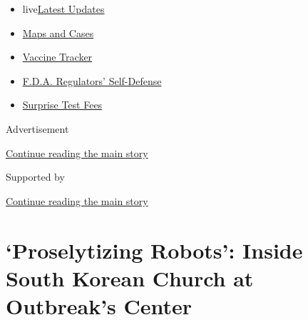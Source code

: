 \begin{itemize}
\tightlist
\item
  live\href{https://www.nytimes3xbfgragh.onion/2020/09/12/world/covid-19-coronavirus.html?name=styln-coronavirus-national\&region=TOP_BANNER\&block=storyline_menu_recirc\&action=click\&pgtype=Article\&impression_id=214bd4e1-f52e-11ea-aca2-5fcae7f3caf4\&variant=undefined}{Latest
  Updates}
\item
  \href{https://www.nytimes3xbfgragh.onion/interactive/2020/us/coronavirus-us-cases.html?name=styln-coronavirus-national\&region=TOP_BANNER\&block=storyline_menu_recirc\&action=click\&pgtype=Article\&impression_id=214bd4e2-f52e-11ea-aca2-5fcae7f3caf4\&variant=undefined}{Maps
  and Cases}
\item
  \href{https://www.nytimes3xbfgragh.onion/interactive/2020/science/coronavirus-vaccine-tracker.html?name=styln-coronavirus-national\&region=TOP_BANNER\&block=storyline_menu_recirc\&action=click\&pgtype=Article\&impression_id=214bd4e3-f52e-11ea-aca2-5fcae7f3caf4\&variant=undefined}{Vaccine
  Tracker}
\item
  \href{https://www.nytimes3xbfgragh.onion/2020/09/10/us/politics/fda-coronavirus-vaccine.html?name=styln-coronavirus-national\&region=TOP_BANNER\&block=storyline_menu_recirc\&action=click\&pgtype=Article\&impression_id=214bd4e4-f52e-11ea-aca2-5fcae7f3caf4\&variant=undefined}{F.D.A.
  Regulators' Self-Defense}
\item
  \href{https://www.nytimes3xbfgragh.onion/2020/09/09/upshot/coronavirus-surprise-test-fees.html?name=styln-coronavirus-national\&region=TOP_BANNER\&block=storyline_menu_recirc\&action=click\&pgtype=Article\&impression_id=214bfbf0-f52e-11ea-aca2-5fcae7f3caf4\&variant=undefined}{Surprise
  Test Fees}
\end{itemize}

Advertisement

\protect\hyperlink{after-top}{Continue reading the main story}

Supported by

\protect\hyperlink{after-sponsor}{Continue reading the main story}

\hypertarget{proselytizing-robots-inside-south-korean-church-at-outbreaks-center}{%
\section{`Proselytizing Robots': Inside South Korean Church at
Outbreak's
Center}\label{proselytizing-robots-inside-south-korean-church-at-outbreaks-center}}

